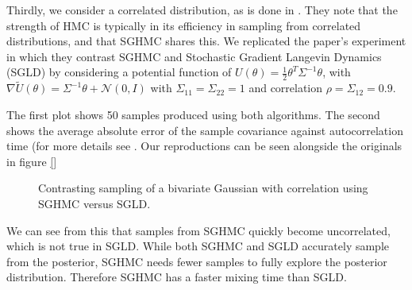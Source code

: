Thirdly, we consider a correlated distribution, as is done in \cite{sghmc}. They note that the strength of HMC is typically in its efficiency in sampling from correlated distributions, and that SGHMC shares this. We replicated the paper's experiment in which they contrast SGHMC and Stochastic Gradient Langevin Dynamics (SGLD) by considering a potential function of $U(\theta)=\frac{1}{2}\theta^T\Sigma^{-1}\theta$, with
$\nabla \widetilde{U}(\theta) = \Sigma^{-1}\theta + \mathcal{N}(0,I)$ with $\Sigma_{11} = \Sigma_{22} = 1$ and correlation $\rho = \Sigma_{12} = 0.9$.  

The first plot shows 50 samples produced using both algorithms. The second shows the average absolute error of the sample covariance against autocorrelation time (for more details see \cite{sghmc}. Our reproductions can be seen alongside the originals in figure \ref{}


\begin{figure}[htp] 
    \centering
    \caption{Contrasting sampling of a bivariate Gaussian with correlation using SGHMC versus SGLD.}
    
    
\end{figure}

We can see from this that samples from SGHMC quickly become uncorrelated, which is not true in SGLD. While both SGHMC and SGLD accurately sample from the posterior, SGHMC needs fewer samples to fully explore the posterior distribution. Therefore SGHMC has a faster mixing time than SGLD.




